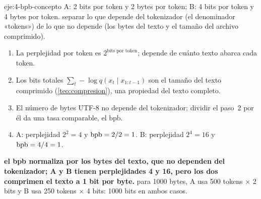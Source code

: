 \begin{solucion}{eje:4-bpb-concepto}
\datos A: 2 bits por token y 2 bytes por token; B: 4 bits por token y 4 bytes por token.
\planteamiento separar lo que depende del tokenizador (el denominador «tokens») de lo que no depende (los bytes del texto y el tamaño del archivo comprimido).
\pasos
\begin{enumerate}[label=\arabic*.]
  \item La perplejidad por token es $2^{\text{bits por token}}$; depende de cuánto texto abarca cada token.
  \item Los bits totales $\sum_t-\log q(x_t\mid x_{1:t-1})$ son el tamaño del texto comprimido (\cref{teo:compresion}), una propiedad del texto completo.
  \item El número de bytes UTF-8 no depende del tokenizador; dividir el paso~2 por él da una tasa comparable, el bpb.
  \item A: perplejidad $2^{2}=4$ y $\operatorname{bpb}=2/2=1$. B: perplejidad $2^{4}=16$ y $\operatorname{bpb}=4/4=1$.
\end{enumerate}
\resultado \textbf{el bpb normaliza por los bytes del texto, que no dependen del tokenizador; A y B tienen perplejidades 4 y 16, pero los dos comprimen el texto a 1 bit por byte.}
\comprobacion para 1000 bytes, A usa 500 tokens $\times$ 2 bits y B usa 250 tokens $\times$ 4 bits: 1000 bits en ambos casos.
\end{solucion}

